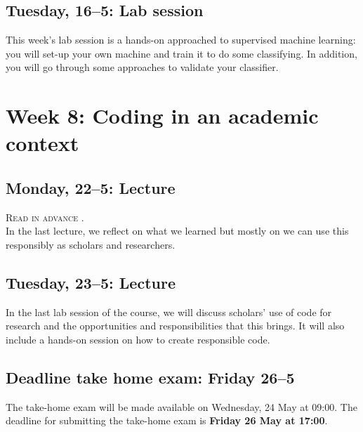 \subsection*{Tuesday, 16--5: Lab session}
This week's lab session is a hands-on approached to supervised machine learning: you will set-up your own machine and train it to do some classifying. In addition, you will go through some approaches to validate your classifier.

\section*{Week 8: Coding in an academic context}

\subsection*{Monday, 22--5: Lecture}
\textsc{ Read in advance \cite{baden_three_2022}.} \\

In the last lecture, we reflect on what we learned but mostly on we can use this responsibly as scholars and researchers. 

\subsection*{Tuesday, 23--5: Lecture}
In the last lab session of the course, we will discuss scholars' use of code for research and the opportunities and responsibilities that this brings. It will also include a hands-on session on how to create responsible code.

\subsection*{Deadline take home exam: Friday 26--5}
The take-home exam will be made available on Wednesday, 24 May at 09:00. The deadline for submitting the take-home exam is \textbf{Friday 26 May at 17:00}.








